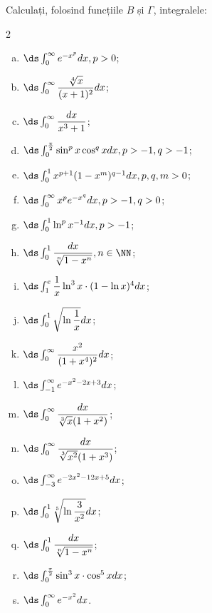 Calculați, folosind funcțiile $ B $ și $ \Gamma $, integralele:
\begin{multicols}{2}
  \begin{enumerate}[(a)]
  \item $ \ds\int_0^\infty e^{-x^p} dx, p > 0 $;
  \item $ \ds\int_0^\infty \dfrac{\sqrt[4]{x}}{(x + 1)^2} dx $;
  \item $ \ds\int_0^\infty \dfrac{dx}{x^3 + 1} $;
  \item $ \ds\int_0^{\frac{\pi}{2}} \sin^p x \cos^q x dx, p > -1, q > -1 $;
  \item $ \ds\int_0^1 x^{p + 1}(1 - x^m)^{q - 1} dx, p, q, m > 0 $;
  \item $ \ds\int_0^\infty x^p e^{-x^q} dx, p > -1, q > 0 $;
  \item $ \ds\int_0^1 \ln^p x^{-1} dx, p > -1 $;
  \item $ \ds\int_0^1 \dfrac{dx}{\sqrt[n]{1 - x^n}}, n \in \NN $;
  \item $ \ds\int_1^e \dfrac{1}{x} \ln^3 x \cdot (1 - \ln x)^4 dx $;
  \item $ \ds\int_0^1 \sqrt{\ln\dfrac{1}{x}} dx $;
  \item $ \ds\int_0^\infty \dfrac{x^2}{(1 + x^4)^2} dx $;
  \item $ \ds\int_{-1}^\infty e^{-x^2 - 2x + 3} dx $;
  \item $ \ds\int_0^\infty \dfrac{dx}{\sqrt[3]{x}(1 + x^2)} $;
  \item $ \ds\int_0^\infty \dfrac{dx}{\sqrt[3]{x^2}(1 + x^3)} $;
  \item $ \ds\int_{-3}^\infty e^{-2x^2 - 12x + 5} dx $;
  \item $ \ds\int_0^1 \sqrt[5]{\ln \dfrac{3}{x^2}} dx $;
  \item $ \ds\int_0^1 \dfrac{dx}{\sqrt[n]{1 - x^n}} $;
  \item $ \ds\int_0^{\frac{\pi}{2}} \sin^3 x \cdot \cos^5 x dx $;
  \item $ \ds\int_0^\infty e^{-x^2} dx $.
  \end{enumerate}
\end{multicols}


